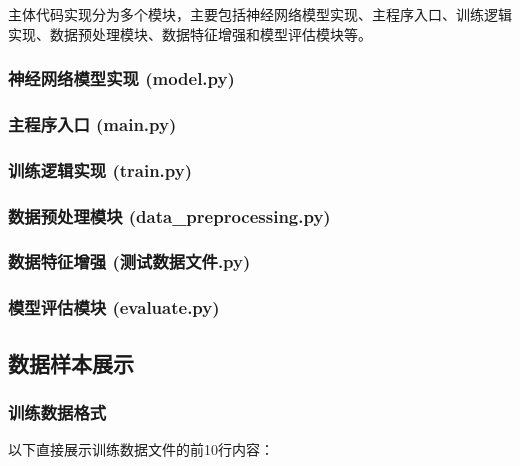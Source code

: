 \documentclass{article}
\begin{document}
主体代码实现分为多个模块，主要包括神经网络模型实现、主程序入口、训练逻辑实现、数据预处理模块、数据特征增强和模型评估模块等。

\subsubsection{神经网络模型实现 (model.py)}


\subsubsection{主程序入口 (main.py)}


\subsubsection{训练逻辑实现 (train.py)}


\subsubsection{数据预处理模块 (data\_preprocessing.py)}


\subsubsection{数据特征增强 (测试数据文件.py)}


\subsubsection{模型评估模块 (evaluate.py)}


\subsection{数据样本展示}
\subsubsection{训练数据格式}
以下直接展示训练数据文件的前10行内容：
\end{document}

